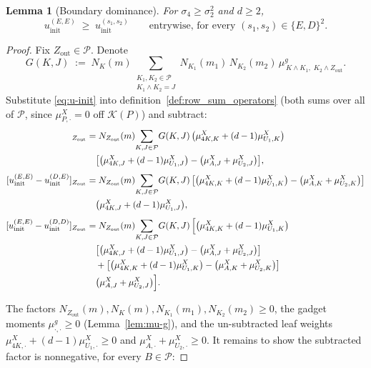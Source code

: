\documentclass[12pt,a4paper]{article}
\newtheorem{lemma}[theorem]{Lemma}
\begin{document}
\begin{lemma}[Boundary dominance]\label{lem:uinit_max_row}
For $\sigma_4\ge\sigma_2^2$ and $d\ge2$,
\[
u_\mathrm{init}^{(E,E)} \;\ge\; u_\mathrm{init}^{(s_1,s_2)} \qquad\text{entrywise, for every }(s_1,s_2)\in\{E,D\}^2 .
\]
\end{lemma}
\begin{proof}
Fix $Z_\mathrm{out}\in\mathcal P$.
Denote $$G(K,J)\;:=\;N_K(m)\!\!\sum_{\substack{K_1,K_2\in\mathcal P\\ K_1\wedge K_2=J}}\!\!
N_{K_1}(m_1)\,N_{K_2}(m_2)\,\mu^g_{\,K\wedge K_1,\;K_2\wedge Z_\mathrm{out}}.$$
Substitute \eqref{eq:u-init} into definition~\ref{def:row_sum_operators} (both sums over all of $\mathcal P$, since
$\mu^X_{P,\cdot}=0$ off $\mathcal K(P)$) and subtract:
\begin{align}
[u_\mathrm{init}^{(E,E)}-u_\mathrm{init}^{(E,D)}]_{Z_\mathrm{out}}
&= N_{Z_\mathrm{out}}(m)\!\sum_{K,J\in\mathcal P}\! G(K,J)\,
\bigl(\mu^X_{4K,K}+(d-1)\mu^X_{U_1,K}\bigr)\nonumber\\
&\quad
\bigl[\bigl(\mu^X_{4K,J}+(d-1)\mu^X_{U_1,J}\bigr)-\bigl(\mu^X_{A,J}+\mu^X_{U_2,J}\bigr)\bigr],
\label{eq:dED}\\[4pt]
[u_\mathrm{init}^{(E,E)}-u_\mathrm{init}^{(D,E)}]_{Z_\mathrm{out}}
&= N_{Z_\mathrm{out}}(m)\!\sum_{K,J\in\mathcal P}\! G(K,J)\,
\bigl[\bigl(\mu^X_{4K,K}+(d-1)\mu^X_{U_1,K}\bigr)-\bigl(\mu^X_{A,K}+\mu^X_{U_2,K}\bigr)\bigr]\nonumber\\
&\quad
\bigl(\mu^X_{4K,J}+(d-1)\mu^X_{U_1,J}\bigr),
\label{eq:dDE}\\[4pt]
[u_\mathrm{init}^{(E,E)}-u_\mathrm{init}^{(D,D)}]_{Z_\mathrm{out}}
&= N_{Z_\mathrm{out}}(m)\!\sum_{K,J\in\mathcal P}\! G(K,J)\,
\Bigl[\bigl(\mu^X_{4K,K}+(d-1)\mu^X_{U_1,K}\bigr)\nonumber\\
&\quad
\bigl[\bigl(\mu^X_{4K,J}+(d-1)\mu^X_{U_1,J}\bigr)-\bigl(\mu^X_{A,J}+\mu^X_{U_2,J}\bigr)\bigr]\nonumber\\
&\quad
+\bigl[\bigl(\mu^X_{4K,K}+(d-1)\mu^X_{U_1,K}\bigr)-\bigl(\mu^X_{A,K}+\mu^X_{U_2,K}\bigr)\bigr]\nonumber\\
&\quad
\bigl(\mu^X_{A,J}+\mu^X_{U_2,J}\bigr)\Bigr].
\label{eq:dDD}
\end{align}

The factors $N_{Z_\mathrm{out}}(m),N_K(m),N_{K_1}(m_1),N_{K_2}(m_2)\ge0$, the gadget
moments $\mu^g_{\cdot,\cdot}\ge0$ (Lemma~\ref{lem:mu-g}), and the un-subtracted leaf
weights $\mu^X_{4K,\cdot}+(d-1)\mu^X_{U_1,\cdot}\ge0$ and
$\mu^X_{A,\cdot}+\mu^X_{U_2,\cdot}\ge0$. It remains to show the subtracted factor is
nonnegative, for every $B\in\mathcal P$:


\end{proof}
\end{document}
